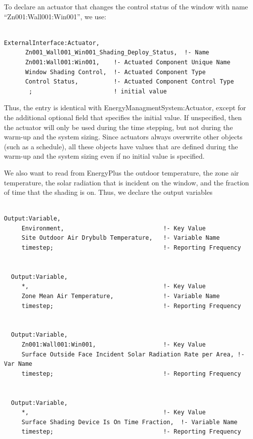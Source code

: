 To declare an actuator that changes the control status of the window with name ``Zn001:Wall001:Win001'', we use:

\begin{lstlisting}

ExternalInterface:Actuator,
      Zn001_Wall001_Win001_Shading_Deploy_Status,  !- Name
      Zn001:Wall001:Win001,    !- Actuated Component Unique Name
      Window Shading Control,  !- Actuated Component Type
      Control Status,          !- Actuated Component Control Type
       ;                       ! initial value
\end{lstlisting}

Thus, the entry is identical with EnergyManagmentSystem:Actuator, except for the additional optional field that specifies the initial value. If unspecified, then the actuator will only be used during the time stepping, but not during the warm-up and the system sizing. Since actuators always overwrite other objects (such as a schedule), all these objects have values that are defined during the warm-up and the system sizing even if no initial value is specified.

We also want to read from EnergyPlus the outdoor temperature, the zone air temperature, the solar radiation that is incident on the window, and the fraction of time that the shading is on. Thus, we declare the output variables

\begin{lstlisting}

Output:Variable,
     Environment,                            !- Key Value
     Site Outdoor Air Drybulb Temperature,   !- Variable Name
     timestep;                               !- Reporting Frequency


  Output:Variable,
     *,                                      !- Key Value
     Zone Mean Air Temperature,              !- Variable Name
     timestep;                               !- Reporting Frequency


  Output:Variable,
     Zn001:Wall001:Win001,                   !- Key Value
     Surface Outside Face Incident Solar Radiation Rate per Area, !- Var Name
     timestep;                               !- Reporting Frequency


  Output:Variable,
     *,                                      !- Key Value
     Surface Shading Device Is On Time Fraction,  !- Variable Name
     timestep;                               !- Reporting Frequency
\end{lstlisting}

